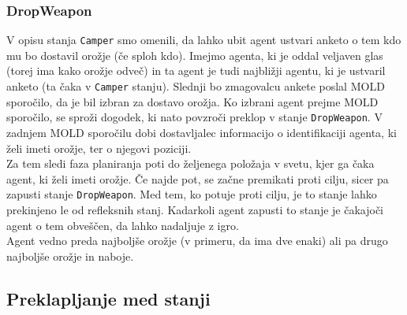 \documentclass[a4paper,10pt]{article}
\begin{document}
\subsubsection{DropWeapon}
V opisu stanja \verb+Camper+ smo omenili, da lahko ubit agent ustvari anketo o tem kdo mu bo dostavil orožje (če sploh kdo). Imejmo agenta, ki je 
oddal veljaven glas (torej ima kako orožje odveč) in ta agent je tudi najbližji agentu, ki je ustvaril anketo (ta čaka v \verb+Camper+ stanju). 
Slednji bo zmagovalcu ankete poslal MOLD sporočilo, da je bil izbran za dostavo orožja. Ko izbrani agent prejme MOLD sporočilo, se sproži dogodek, 
ki nato povzroči preklop v stanje \verb+DropWeapon+. V zadnjem MOLD sporočilu dobi dostavljalec informacijo o identifikaciji agenta, ki želi imeti
orožje, ter o njegovi poziciji.\\
Za tem sledi faza planiranja poti do željenega položaja v svetu, kjer ga čaka agent, ki želi imeti orožje. Če najde pot, se začne premikati proti cilju, sicer
pa zapusti stanje \verb+DropWeapon+. Med tem, ko potuje proti cilju, je to stanje lahko prekinjeno le od refleksnih stanj. Kadarkoli agent zapusti to stanje
je čakajoči agent o tem obveščen, da lahko nadaljuje z igro.\\
Agent vedno preda najboljše orožje (v primeru, da ima dve enaki) ali pa drugo najboljše orožje in naboje.

\subsection{Preklapljanje med stanji}
\end{document}

